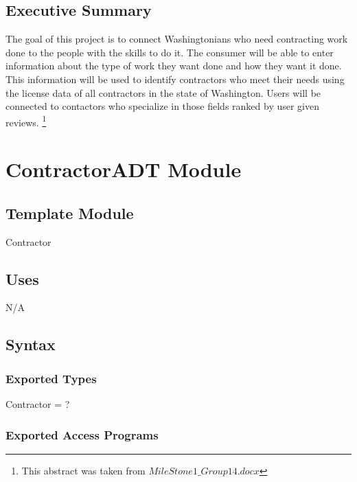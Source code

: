 \documentclass[12pt]{scrartcl}
\begin{document}
\subsection* {Executive Summary}

The goal of this project is to connect Washingtonians who need contracting work done to the people with the skills to do it. The consumer will be able to enter information about the type of work they want done and how they want it done. This information will be used to identify contractors who meet their needs using the license data of all contractors in the state of Washington. Users will be connected to contactors who specialize in those fields ranked by user given reviews. \footnote{This abstract was taken from $\textit{MileStone1\_Group14.docx}$}

\newpage 

\tableofcontents 

\newpage

\section {ContractorADT Module}

\subsection{Template Module}

Contractor

\subsection {Uses}

N/A

\subsection {Syntax}

\subsubsection {Exported Types}

Contractor = ?

\subsubsection {Exported Access Programs}
\end{document}
